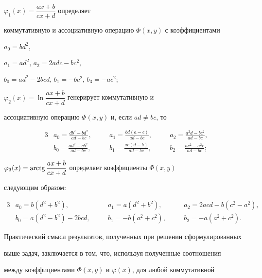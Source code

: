 $\varphi_1(x)=\dfrac{ax+b}{cx+d}$ определяет


коммутативную и ассоциативную операцию $\Phi(x,y)$ с коэффициентами


$a_0=bd^2$,


$a_1=ad^2$, $a_2=2adc-bc^2$,


$b_0=ad^2-2bcd$, $b_1=-bc^2$, $b_3=-ac^2$;





$\varphi_2(x)=\ln\dfrac{ax+b}{cx+d}$ генерирует коммутативную и


ассоциативную операцию $\Phi(x,y)$ и, если $ad\ne bc$, то


\begin{alignat*}{3}


& a_0=\frac{db^2-bd^2}{ad-bc}, &\quad


& a_1=\frac{bd(a-c)}{ad-bc}, &\quad


& a_2=\frac{a^2d-bc^2}{ad-bc},\\


& b_0=\frac{ad^2-cb^2}{ad-bc}, &\quad


& b_1=\frac{ac(d-b)}{ad-bc},& \quad


& b_2=\frac{ac^2-a^2c}{ad-bc};


\end{alignat*}





$\varphi_3(x)=\operatorname{arctg}\dfrac{ax+b}{cx+d}$ определяет коэффициенты $\Phi(x,y)$


следующим образом:


\begin{alignat*}{3}


& a_0=b(d^2+b^2), &\quad & a_1=a(d^2+b^2), &\quad


& a_2=2acd-b(c^2-a^2),\\


& b_0=a(d^2-b^2)-2bcd, &\quad & b_1=-b(a^2+c^2), &\quad


& b_2=-a(a^2+c^2).


\end{alignat*}





Практический смысл результатов, полученных при решении сформулированных


выше задач, заключается в том, что, используя полученные соотношения


между коэффициентами $\Phi(x,y)$ и $\varphi(x)$, для любой коммутативной


